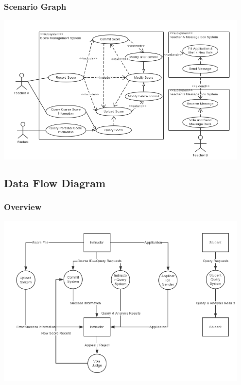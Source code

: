 \documentclass[a4]{article}
\begin{document}
\subsubsection{Scenario Graph}
\includegraphics[width=5in]{pic/1.png}
\subsection{Data Flow Diagram}
\subsubsection{Overview}
\includegraphics[width=5in]{pic/2-0.png}
\end{document}
